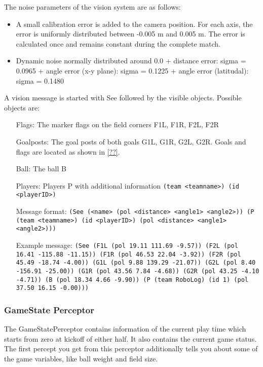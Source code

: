 The noise parameters of the vision system are as follows:
\begin{itemize}
  \item A small calibration error is added to the camera position. For each
  axis, the error is uniformly distributed between -0.005 m and 0.005 m. The
  error is calculated once and remains constant during the complete match.
  \item Dynamic noise normally distributed around 0.0
  + distance error:  sigma = 0.0965
  + angle error (x-y plane): sigma = 0.1225
  + angle error (latitudal): sigma = 0.1480
\end{itemize}

A vision message is started with See followed by the visible objects.
Possible objects are:
\begin{itemize}
	\item[Flags:] The marker flags on the field corners F1L, F1R, F2L, F2R
	\item[Goalposts:] The goal posts of both goals G1L, G1R, G2L, G2R. Goals and
	flags are located as shown in \ref{??}.
	\item[Ball:] The ball B 
	\item[Players:] Players P with additional information \texttt{(team <teamname>)
	(id <playerID>)}
\end{itemize}
\begin{itemize}
	\item[Message format:] \texttt{(See (<name> (pol <distance> <angle1>
	<angle2>)) (P (team <teamname>) (id <playerID>) (pol <distance> <angle1> <angle2>)))}
	\item[Example message:] \texttt{(See (F1L (pol 19.11 111.69 -9.57)) (F2L (pol 
	16.41 -115.88 -11.15)) (F1R (pol 46.53 22.04 -3.92)) (F2R (pol 45.49 -18.74
	-4.00)) (G1L (pol 9.88 139.29 -21.07)) (G2L (pol 8.40 -156.91 -25.00)) (G1R
	(pol 43.56 7.84 -4.68)) (G2R (pol 43.25 -4.10 -4.71)) (B (pol 18.34 4.66
	-9.90)) (P (team RoboLog) (id 1) (pol 37.50 16.15 -0.00)))}
\end{itemize}

\subsubsection{GameState Perceptor}
The GameStatePerceptor contains information of the current play time which
starts from zero at kickoff of either half. It also contains the current game status.
The first percept you get from this perceptor additionally tells you about some
of the game variables, like ball weight and field size.

